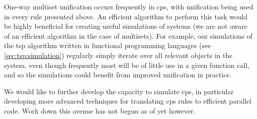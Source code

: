One-way multiset unification occurs frequently in \gls{cps}, with unification being used in every rule presented above.  An efficient algorithm to perform this task would be highly beneficial for creating useful simulations of systems (we are not aware of an efficient algorithm in the case of multisets).  For example, our simulations of the \gls{tsp} algorithm written in functional programming languages (see \autoref{sec:tsp:simulation}) regularly simply iterate over all relevant objects in the system, even though frequently most will be of little use in a given function call, and so the simulations could benefit from improved unification in practice.

We would like to further develop the capacity to simulate \gls{cps}, in particular developing more advanced techniques for translating \gls{cps} rules to efficient parallel code.  Work down this avenue has not begun as of yet however.